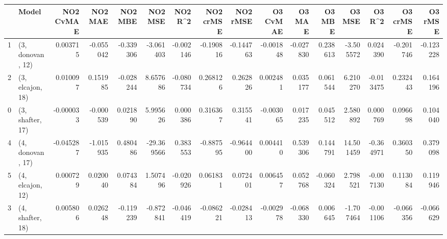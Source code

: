 \begin{tabular}{llrrrrrrrrrrrrrr}
\toprule
{} &             Model &  NO2 CvMAE &   NO2 MAE &   NO2 MBE &    NO2 MSE &   NO2 R\textasciicircum2 &  NO2 crMSE &  NO2 rMSE &  O3 CvMAE &    O3 MAE &    O3 MBE &     O3 MSE &    O3 R\textasciicircum2 &  O3 crMSE &   O3 rMSE \\
\midrule
1 &  (3, donovan, 12) &   0.003715 & -0.055042 & -0.339306 &  -3.061403 & -0.002146 &  -0.190816 & -0.144763 & -0.001848 & -0.027830 &  0.238613 &  -3.505572 &  0.024390 & -0.201746 & -0.123228 \\
2 &  (3, elcajon, 18) &   0.010097 &  0.151985 & -0.028244 &   8.657686 & -0.080734 &   0.268126 &  0.262826 &  0.002481 &  0.035177 &  0.061544 &   6.210270 & -0.013475 &  0.232443 &  0.164196 \\
0 &  (3, shafter, 17) &  -0.000033 & -0.000539 &  0.021890 &   5.995626 &  0.000386 &   0.316367 &  0.315541 & -0.003065 &  0.017235 &  0.045512 &   2.580892 &  0.000769 &  0.096698 &  0.104040 \\
4 &  (4, donovan, 17) &  -0.045287 & -1.015935 &  0.480486 & -29.369566 &  0.383553 &  -0.887595 & -0.964400 &  0.004410 &  0.539306 &  0.144791 &  14.501459 & -0.364971 &  0.360350 &  0.379098 \\
5 &  (4, elcajon, 12) &   0.000729 &  0.020040 &  0.074384 &   1.507496 & -0.020926 &   0.061831 &  0.072401 &  0.006457 &  0.052768 & -0.060324 &   2.798521 & -0.007130 &  0.113084 &  0.119946 \\
3 &  (4, shafter, 18) &   0.005806 &  0.026248 & -0.119239 &  -0.872841 & -0.046419 &  -0.086221 & -0.028413 & -0.002978 & -0.068330 &  0.006645 &  -1.707464 & -0.001106 & -0.066356 & -0.066629 \\
\bottomrule
\end{tabular}

